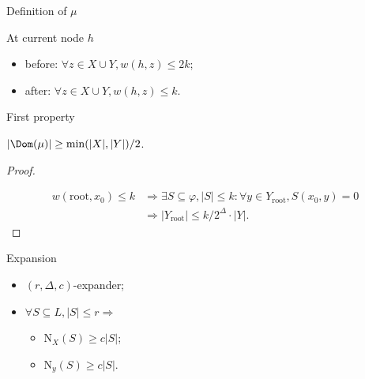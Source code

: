 \begin{frame}{Definition of $\mu$}
    \begin{lemma}
        At current node $h$
        \begin{itemize}
            \item before: $\forall z \in X \cup Y, w(h, z) \le 2k$;
            \item after: $\forall z \in X \cup Y, w(h, z) \le k$.
        \end{itemize}
    \end{lemma}
\end{frame}

\begin{frame}{First property}
    \begin{lemma}
        $|\Dom(\mu)| \ge \min(|X|, |Y|) / 2$.
    \end{lemma}
    \begin{proof}

        \pause
        \begin{center}
            
        \end{center}

        \pause
        \begin{align*}
          w(\mathrm{root}, x_0) \le k & \Rightarrow
                                        \exists S \subseteq \varphi, |S| \le k: \forall y
                                        \in Y_{\mathrm{root}}, S(x_0, y) = 0 \\
                                      & \Rightarrow |Y_{\mathrm{root}}| \le k / 2^{\Delta} \cdot |Y|.
        \end{align*}
    \end{proof}    
\end{frame}


\begin{frame}{Expansion}

    \begin{minipage}{0.38\linewidth}
        \centering
        
    \end{minipage}
    \begin{minipage}{0.58\linewidth}
        \begin{itemize}
            \item $(r, \Delta, c)$-expander;
            \item $\forall S \subseteq L, |S| \le r \Rightarrow$
                \begin{itemize}
                    \item $\mathrm{N}_{X}(S) \ge c |S|$;
                    \item $\mathrm{N}_{y}(S) \ge c |S|$.
                \end{itemize}
        \end{itemize}
    \end{minipage}
\end{frame}

